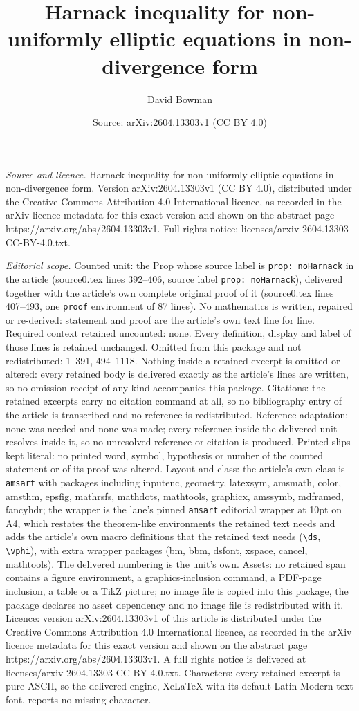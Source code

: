 \documentclass[10pt,a4paper]{amsart}
\title[Harnack inequality for non-uniformly elliptic equations in n]{Harnack inequality for non-uniformly elliptic equations in non-divergence form}
\author{David Bowman}
\date{Source: arXiv:2604.13303v1 (CC BY 4.0)}
\begin{document}
\maketitle

\noindent\emph{Source and licence.} Harnack inequality for non-uniformly elliptic equations in non-divergence form. Version arXiv:2604.13303v1 (CC BY 4.0), distributed under the Creative Commons Attribution 4.0 International licence, as recorded in the arXiv licence metadata for this exact version and shown on the abstract page https://arxiv.org/abs/2604.13303v1. Full rights notice: licenses/arxiv-2604.13303-CC-BY-4.0.txt.\par\smallskip

\noindent\textit{Editorial scope.} Counted unit: the Prop whose source label is \texttt{prop: noHarnack} in the article (source0.tex lines 392--406, source label \texttt{prop: noHarnack}), delivered together with the article's own complete original proof of it (source0.tex lines 407--493, one \texttt{proof} environment of 87 lines). No mathematics is written, repaired or re-derived: statement and proof are the article's own text line for line. Required context retained uncounted: none. Every definition, display and label of those lines is retained unchanged. Omitted from this package and not redistributed: 1--391, 494--1118. Nothing inside a retained excerpt is omitted or altered: every retained body is delivered exactly as the article's lines are written, so no omission receipt of any kind accompanies this package. Citations: the retained excerpts carry no citation command at all, so no bibliography entry of the article is transcribed and no reference is redistributed. Reference adaptation: none was needed and none was made; every reference inside the delivered unit resolves inside it, so no unresolved reference or citation is produced. Printed slips kept literal: no printed word, symbol, hypothesis or number of the counted statement or of its proof was altered. Layout and class: the article's own class is \texttt{amsart} with packages including inputenc, geometry, latexsym, amsmath, color, amsthm, epsfig, mathrsfs, mathdots, mathtools, graphicx, amssymb, mdframed, fancyhdr; the wrapper is the lane's pinned \texttt{amsart} editorial wrapper at 10pt on A4, which restates the theorem-like environments the retained text needs and adds the article's own macro definitions that the retained text needs (\texttt{\textbackslash ds}, \texttt{\textbackslash vphi}), with extra wrapper packages (bm, bbm, dsfont, xspace, cancel, mathtools). The delivered numbering is the unit's own. Assets: no retained span contains a figure environment, a graphics-inclusion command, a PDF-page inclusion, a table or a TikZ picture; no image file is copied into this package, the package declares no asset dependency and no image file is redistributed with it. Licence: version arXiv:2604.13303v1 of this article is distributed under the Creative Commons Attribution 4.0 International licence, as recorded in the arXiv licence metadata for this exact version and shown on the abstract page https://arxiv.org/abs/2604.13303v1. A full rights notice is delivered at licenses/arxiv-2604.13303-CC-BY-4.0.txt. Characters: every retained excerpt is pure ASCII, so the delivered engine, XeLaTeX with its default Latin Modern text font, reports no missing character.
\end{document}
